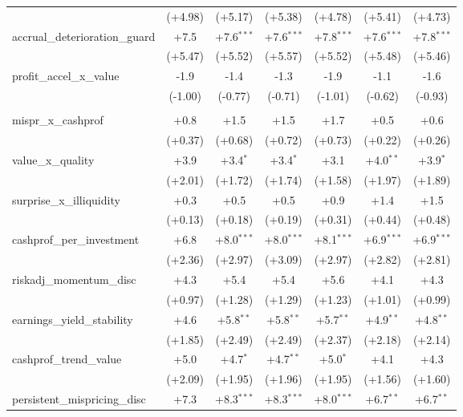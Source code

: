 \begin{table}[htbp]
\begin{threeparttable}
\begin{tabular}{lcccccc}
 & (+4.98) & (+5.17) & (+5.38) & (+4.78) & (+5.41) & (+4.73) \\
\addlinespace
accrual\_deterioration\_guard & +7.5 & +7.6$^{***}$ & +7.6$^{***}$ & +7.8$^{***}$ & +7.6$^{***}$ & +7.8$^{***}$ \\
 & (+5.47) & (+5.52) & (+5.57) & (+5.52) & (+5.48) & (+5.46) \\
\addlinespace
profit\_accel\_x\_value & -1.9 & -1.4 & -1.3 & -1.9 & -1.1 & -1.6 \\
 & (-1.00) & (-0.77) & (-0.71) & (-1.01) & (-0.62) & (-0.93) \\
\addlinespace
\midrule
\multicolumn{7}{l}{\textit{Panel B: Out-of-sample (post-2000-12-31)}} \\
\addlinespace
mispr\_x\_cashprof & +0.8 & +1.5 & +1.5 & +1.7 & +0.5 & +0.6 \\
 & (+0.37) & (+0.68) & (+0.72) & (+0.73) & (+0.22) & (+0.26) \\
\addlinespace
value\_x\_quality & +3.9 & +3.4$^{*}$ & +3.4$^{*}$ & +3.1 & +4.0$^{**}$ & +3.9$^{*}$ \\
 & (+2.01) & (+1.72) & (+1.74) & (+1.58) & (+1.97) & (+1.89) \\
\addlinespace
surprise\_x\_illiquidity & +0.3 & +0.5 & +0.5 & +0.9 & +1.4 & +1.5 \\
 & (+0.13) & (+0.18) & (+0.19) & (+0.31) & (+0.44) & (+0.48) \\
\addlinespace
cashprof\_per\_investment & +6.8 & +8.0$^{***}$ & +8.0$^{***}$ & +8.1$^{***}$ & +6.9$^{***}$ & +6.9$^{***}$ \\
 & (+2.36) & (+2.97) & (+3.09) & (+2.97) & (+2.82) & (+2.81) \\
\addlinespace
riskadj\_momentum\_disc & +4.3 & +5.4 & +5.4 & +5.6 & +4.1 & +4.3 \\
 & (+0.97) & (+1.28) & (+1.29) & (+1.23) & (+1.01) & (+0.99) \\
\addlinespace
earnings\_yield\_stability & +4.6 & +5.8$^{**}$ & +5.8$^{**}$ & +5.7$^{**}$ & +4.9$^{**}$ & +4.8$^{**}$ \\
 & (+1.85) & (+2.49) & (+2.49) & (+2.37) & (+2.18) & (+2.14) \\
\addlinespace
cashprof\_trend\_value & +5.0 & +4.7$^{*}$ & +4.7$^{**}$ & +5.0$^{*}$ & +4.1 & +4.3 \\
 & (+2.09) & (+1.95) & (+1.96) & (+1.95) & (+1.56) & (+1.60) \\
\addlinespace
persistent\_mispricing\_disc & +7.3 & +8.3$^{***}$ & +8.3$^{***}$ & +8.0$^{***}$ & +6.7$^{**}$ & +6.7$^{**}$ \\

\end{tabular}
\end{threeparttable}
\end{table}
